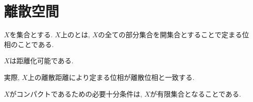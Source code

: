 \documentclass[uplatex, dvipdfmx, a4paper, 12pt, class=jsbook, crop=false]{standalone}
\begin{document}
\section{離散空間}
\label{ex:discrete-space}

$ X $を集合とする. $ X $上のとは, $ X $の全ての部分集合を開集合とすることで定まる位相のことである.

\begin{property}
	$ X $は距離化可能である.
\end{property}
実際, $ X $上の離散距離により定まる位相が離散位相と一致する.

\begin{property}
	$ X $がコンパクトであるための必要十分条件は, $ X $が有限集合となることである.
\end{property}
\end{document}
